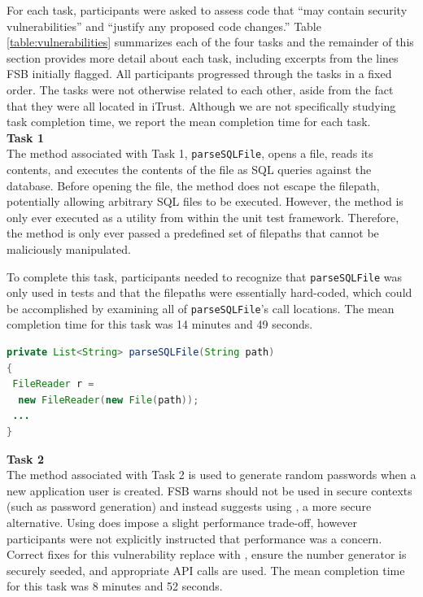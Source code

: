 \documentclass[10pt,journal,compsoc]{IEEEtran}
\begin{document}
For each task, participants were asked to assess code that ``may contain security vulnerabilities'' and ``justify any proposed code changes.''
Table \ref{table:vulnerabilities} summarizes each of the four tasks and the remainder of this section provides more detail about each task, including excerpts from the lines FSB initially flagged.
All participants progressed through the tasks in a fixed order.
The tasks were not otherwise related to each other, aside from the fact that they were all located in iTrust.
Although we are not specifically studying task completion time, we report the mean completion time for each task.\\

\noindent\textbf{Task 1} \\
The method associated with Task 1, \texttt{parseSQLFile}, opens a file, reads its contents, and executes the contents of the file as SQL queries against the database. 
Before opening the file, the method does not escape the filepath, potentially allowing arbitrary SQL files to be executed.
However, the method is only ever executed as a utility from within the unit test framework.
Therefore, the method is only ever passed a predefined set of filepaths that cannot be maliciously manipulated.

To complete this task, participants needed to recognize that \texttt{parseSQLFile} was only used in tests and that the filepaths were essentially hard-coded, which could be accomplished by examining all of \texttt{parseSQLFile}'s call locations.
The mean completion time for this task was 14 minutes and 49 seconds.

\begin{lstlisting}[language=Java]
private List<String> parseSQLFile(String path)
{
 FileReader r =
  new FileReader(new File(path));
 ... 
}
\end{lstlisting}

\noindent\textbf{Task 2} \\
The method associated with Task 2 is used to generate random passwords when a new application user is created. 
FSB warns  should not be used in secure contexts (such as password generation) and instead suggests using , a more secure alternative. 
Using  does impose a slight performance trade-off, however participants were not explicitly instructed that performance was a concern.
Correct fixes for this vulnerability replace  with , ensure the number generator is securely seeded, and appropriate API calls are used.
The mean completion time for this task was 8 minutes and 52 seconds.
\end{document}

